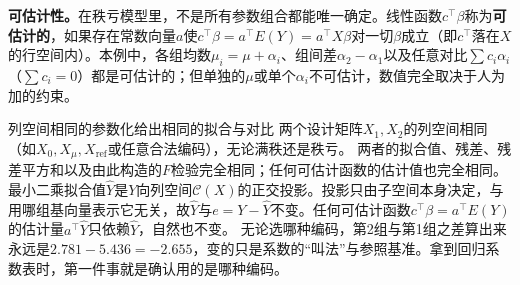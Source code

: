 \textbf{可估计性。}在秩亏模型里，不是所有参数组合都能唯一确定。线性函数$c^\top\beta$称为\textbf{可估计的}，如果存在常数向量$a$使$c^\top\beta=a^\top E(Y)=a^\top X\beta$对一切$\beta$成立（即$c^\top$落在$X$的行空间内）。本例中，各组均数$\mu_i=\mu+\alpha_i$、组间差$\alpha_2-\alpha_1$以及任意对比$\sum c_i\alpha_i$（$\sum c_i=0$）都是可估计的；但单独的$\mu$或单个$\alpha_i$不可估计，数值完全取决于人为加的约束。
\begin{derivation}{列空间相同的参数化给出相同的拟合与对比}
两个设计矩阵$X_1,X_2$的列空间相同（如$X_0,X_\mu,X_{\mathrm{ref}}$或任意合法编码），无论满秩还是秩亏。
两者的拟合值、残差、残差平方和以及由此构造的$F$检验完全相同；任何可估计函数的估计值也完全相同。
最小二乘拟合值$\widehat Y$是$Y$向列空间$\mathcal C(X)$的正交投影。投影只由子空间本身决定，与用哪组基向量表示它无关，故$\widehat Y$与$e=Y-\widehat Y$不变。任何可估计函数$c^\top\beta=a^\top E(Y)$的估计量$a^\top\widehat Y$只依赖$\widehat Y$，自然也不变。
无论选哪种编码，第2组与第1组之差算出来永远是$2.781-5.436=-2.655$，变的只是系数的“叫法”与参照基准。拿到回归系数表时，第一件事就是确认用的是哪种编码。
\end{derivation}
